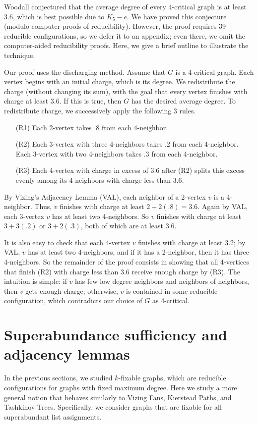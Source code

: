 \documentclass[12pt]{article}
\theoremstyle{plain}
\theoremstyle{definition}
\theoremstyle{remark}
\def\ch{\textrm{ch}}
\begin{document}
Woodall conjectured \cite{woodall2008average} that the average degree of every
4-critical graph is at least 3.6, which is best possible due to $K_5-e$.
We have proved this conjecture (modulo computer proofs of reducibility).
However, the proof requires 39 reducible configurations, so we defer it to an
appendix; even there, we omit the computer-aided reducibility proofs.
Here, we give a brief outline to illustrate the technique.

Our proof uses the discharging method.  Assume that $G$ is a 4-critical graph.
Each vertex begins with an initial charge, which is its degree.  We redistribute
the charge (without changing its sum), with the goal that every vertex finishes
with charge at least 3.6.  If this is true, then $G$ has the desired average
degree.  To redistribute charge, we successively apply the following 3 rules.

\begin{enumerate}
\item[(R1)] Each 2-vertex takes $.8$ from each 4-neighbor.
\item[(R2)] Each 3-vertex with three 4-neighbors takes $.2$ from each 4-neighbor.
Each 3-vertex with two 4-neighbors takes $.3$ from each 4-neighbor.
\item[(R3)] Each 4-vertex with charge in excess of $3.6$ after (R2) splits this
		excess evenly among its 4-neighbors with charge less than $3.6$.
\end{enumerate}
	
	
By Vizing's Adjacency Lemma (VAL), each neighbor of a 2-vertex $v$ is a
4-neighbor.  Thus, $v$ finishes with charge at least $2+2(.8)=3.6$.
Again by VAL, each 3-vertex $v$ has at least two 4-neighbors. So $v$ finishes
with charge at least $3+3(.2)$ or $3+2(.3)$, both of which are at least 3.6.

It is also easy to check that each 4-vertex $v$ finishes with charge at least 3.2;
by VAL, $v$ has at least two 4-neighbors, and if it has a 2-neighbor, then it has
three 4-neighbors.  So the remainder of the proof consists in showing that all
4-vertices that finish (R2) with charge less than 3.6 receive enough charge by
(R3).  The intuition is simple: if $v$ has few low degree neighbors and
neighbors of neighbors, then $v$ gets enough charge; otherwise, $v$ is contained
in some reducible configuration, which contradicts our choice of $G$ as
4-critical.
	

\section{Superabundance sufficiency and adjacency lemmas}
In the previous sections, we studied $k$-fixable graphs, which are reducible
configurations for graphs with fixed maximum degree.  Here we study a more
general notion that behaves similarly to Vizing Fans, Kierstead Paths, and
Tashkinov Trees.  Specifically, we consider graphs that are fixable for all
superabundant list assignments.  
\end{document}
